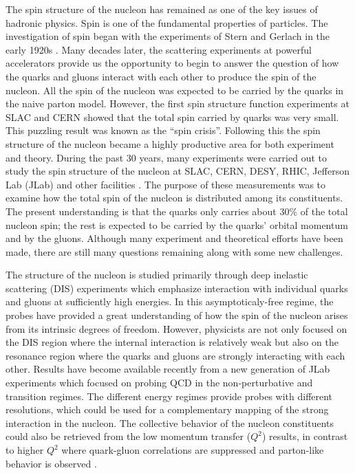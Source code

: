 The spin structure of the nucleon has remained as one of the key issues of hadronic physics. Spin is one of the fundamental properties of particles. The investigation of spin began with the experiments of Stern and Gerlach in the early 1920s \cite{Gerlach1922}. Many decades later, the scattering experiments at powerful accelerators provide us the opportunity to begin to answer the question of how the quarks and gluons interact with each other to produce the spin of the nucleon. All the spin of the nucleon was expected to be carried by the quarks in the naive parton model. However, the first spin structure function experiments at SLAC \cite{Alguard1978} and CERN \cite{Ashman1988} showed that the total spin carried by quarks was very small. This puzzling result was known as the ``spin crisis''. Following this the spin structure of the nucleon became a highly productive area for both experiment and theory. During the past 30 years, many experiments were carried out to study the spin structure of the nucleon at SLAC, CERN, DESY, RHIC, Jefferson Lab (JLab) and other facilities \cite{Kuhn2009}. The purpose of these measurements was to examine how the total spin of the nucleon is distributed among its constituents. The present understanding is that the quarks only carries about 30\% of the total nucleon spin; the rest is expected to be carried by the quarks' orbital momentum and by the gluons. Although many experiment and theoretical efforts have been made, there are still many questions remaining along with some new challenges.

The structure of the nucleon is studied primarily through deep inelastic scattering (DIS) experiments which emphasize interaction with individual quarks and gluons at sufficiently high energies. In this asymptoticaly-free regime, the probes have provided a great understanding of how the spin of the nucleon arises from its intrinsic degrees of freedom. However, physicists are not only focused on the DIS region where the internal interaction is relatively weak but also on the resonance region where the quarks and gluons are strongly interacting with each other. Results have become available recently from a new generation of JLab experiments which focused on probing QCD in the non-perturbative and transition regimes. The different energy regimes provide probes with different resolutions, which could be used for a complementary mapping of the strong interaction in the nucleon. The collective behavior of the nucleon constituents could also be retrieved from the low momentum transfer ($Q^2$) results, in contrast to higher $Q^2$ where quark-gluon correlations are suppressed and parton-like behavior is observed \cite{G2P}.

